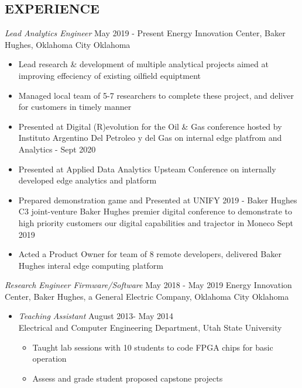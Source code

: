 \documentclass[line,margin]{res}
\begin{document}
\begin{resume}
	\section{EXPERIENCE}
	 {\sl Lead Analytics Engineer} \hfill May 2019 - Present
	Energy Innovation Center, Baker Hughes, Oklahoma City Oklahoma
	\begin{itemize} \itemsep -2pt
		\item Lead research & development of multiple analytical projects aimed at improving effeciency of existing oilfield equiptment
		\item Managed local team of 5-7 researchers to complete these project, and deliver for customers in timely manner
		\item Presented at Digital (R)evolution for the Oil & Gas conference hosted by Instituto Argentino Del Petroleo y del Gas on internal edge platfrom and Analytics - Sept 2020
		\item Presented at  Applied Data Analytics Upsteam Conference on internally developed edge analytics and platform
		\item Prepared demonstration game and Presented at UNIFY 2019 - Baker Hughes C3 joint-venture Baker Hughes premier digital conference to demonstrate to high priority customers our digital capabilities and trajector in Moneco Sept 2019
		\item Acted a Product Owner for team of 8 remote developers, delivered Baker Hughes interal edge computing platform 
	\end{itemize}
	{\sl Research Engineer Firmware/Software} \hfill May 2018 - May 2019
	Energy Innovation Center, Baker Hughes, a General Electric Company, Oklahoma City Oklahoma
	\begin{itemize} \itemsep -2pt
		\item
	{\sl Teaching Assistant} \hfill August 2013- May 2014 \\
	Electrical and Computer Engineering Department, Utah State University
	\begin{itemize}  \itemsep -2pt %
		\item Taught lab sessions with 10 students to code FPGA chips for
		      basic operation
		\item Assess and grade student proposed capstone projects
	\end{itemize}


\end{itemize}
\end{resume}
\end{document}
